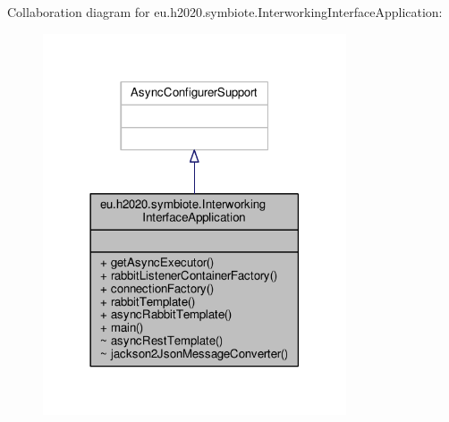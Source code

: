 Collaboration diagram for eu.\+h2020.\+symbiote.\+Interworking\+Interface\+Application\+:\nopagebreak
\begin{figure}[H]
\begin{center}
\leavevmode
\includegraphics[width=254pt]{classeu_1_1h2020_1_1symbiote_1_1InterworkingInterfaceApplication__coll__graph}
\end{center}
\end{figure}
